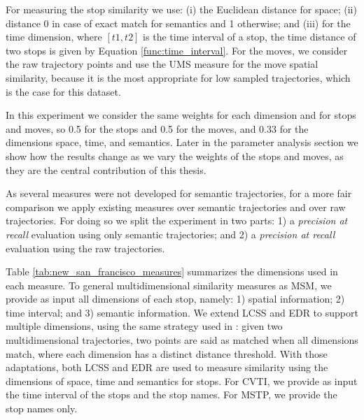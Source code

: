 {For measuring the stop similarity we use: (i) the Euclidean distance for space; (ii)  distance 0 in case of exact match for semantics and 1 otherwise; and (iii) for the time dimension, where $[t1, t2]$ is the time interval of a stop, the time distance of two stops is given by  Equation {\ref{func:time_interval}}. For the moves, we consider the raw trajectory points and use the UMS measure for the move spatial similarity, because it is the most appropriate for low sampled trajectories, which is the case for this dataset.

In this experiment we consider the same weights for each dimension and for stops and moves, so 0.5 for the stops and 0.5 for the moves, and 0.33 for the dimensions space, time, and semantics. Later in the parameter analysis section we show how the results change as we vary the weights of the stops and moves, as they are the central contribution of this thesis.

As several measures were not developed for semantic trajectories, for a more fair comparison we apply existing measures over semantic trajectories and over raw trajectories. For doing so we split the experiment in two parts: 1) a \textit{precision at recall} evaluation using only semantic trajectories; and 2) a \textit{precision at recall} evaluation using the raw trajectories.}

{Table {\ref{tab:new_san_francisco_measures}} summarizes the dimensions used in each measure. To general multidimensional similarity measures as MSM, we provide as input all dimensions of each stop, namely: 1) spatial information; 2) time interval; and 3) semantic information. We extend LCSS and EDR to support multiple dimensions, using the same strategy used in }\cite{Furtado:TGIS12156}{: given two multidimensional trajectories, two points are said as matched when all dimensions match, where each dimension has a distinct distance threshold. With those adaptations, both LCSS and EDR are used to measure similarity using the dimensions of space, time and semantics for stops. For CVTI, we provide as input the time interval of the stops and the stop names. For MSTP, we provide the stop names only.}

